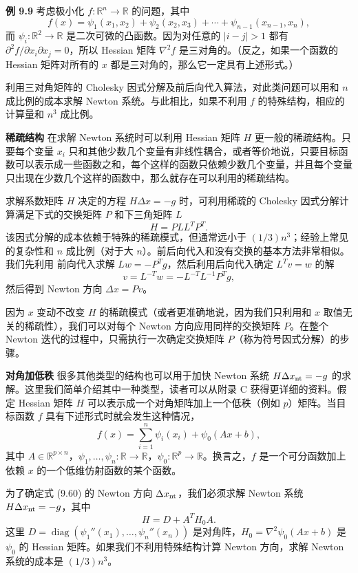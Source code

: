 \documentclass[UTF8,12pt,a4paper,fontset=fandol]{ctexart}
\begin{document}
\noindent\textbf{例 9.9}\quad
考虑极小化 $f:\mathbb{R}^n\to\mathbb{R}$ 的问题，其中
\[
f(x)=\psi_1(x_1,x_2)+\psi_2(x_2,x_3)+\cdots+\psi_{n-1}(x_{n-1},x_n),
\]
而 $\psi_i:\mathbb{R}^2\to\mathbb{R}$ 是二次可微的凸函数。因为对任意的 $|i-j|>1$ 都有 $\partial^2 f/\partial x_i\partial x_j=0$，所以 Hessian 矩阵 $\nabla^2 f$ 是三对角的。（反之，如果一个函数的 Hessian 矩阵对所有的 $x$ 都是三对角的，那么它一定具有上述形式。）

利用三对角矩阵的 Cholesky 因式分解及前后向代入算法，对此类问题可以用和 $n$ 成比例的成本求解 Newton 系统。与此相比，如果不利用 $f$ 的特殊结构，相应的计算量和 $n^3$ 成比例。

\noindent\textbf{稀疏结构}\quad
在求解 Newton 系统时可以利用 Hessian 矩阵 $H$ 更一般的稀疏结构。只要每个变量 $x_i$ 只和其他少数几个变量有非线性耦合，或者等价地说，只要目标函数可以表示成一些函数之和，每个这样的函数只依赖少数几个变量，并且每个变量只出现在少数几个这样的函数中，那么就存在可以利用的稀疏结构。

求解系数矩阵 $H$ 决定的方程 $H\Delta x=-g$ 时，可利用稀疏的 Cholesky 因式分解计算满足下式的交换矩阵 $P$ 和下三角矩阵 $L$
\[
H=PLL^TP^T.
\]
该因式分解的成本依赖于特殊的稀疏模式，但通常远小于 $(1/3)n^3$；经验上常见的复杂性和 $n$ 成比例（对于大 $n$）。前后向代入和没有交换的基本方法非常相似。我们先利用
前向代入求解 $Lw=-P^Tg$，然后利用后向代入确定 $L^Tv=w$ 的解
\[
v=L^{-T}w=-L^{-T}L^{-1}P^Tg,
\]
然后得到 Newton 方向 $\Delta x=Pv$。

因为 $x$ 变动不改变 $H$ 的稀疏模式（或者更准确地说，因为我们只利用和 $x$ 取值无关的稀疏性），我们可以对每个 Newton 方向应用同样的交换矩阵 $P$。在整个 Newton 迭代的过程中，只需执行一次确定交换矩阵 $P$（称为符号因式分解）的步骤。

\noindent\textbf{对角加低秩}\quad
很多其他类型的结构也可以用于加快 Newton 系统 $H\Delta x_{\rm nt}=-g$ 的求解。这里我们简单介绍其中一种类型，读者可以从附录 C 获得更详细的资料。假定 Hessian 矩阵 $H$ 可以表示成一个对角矩阵加上一个低秩（例如 $p$）矩阵。当目标函数 $f$ 具有下述形式时就会发生这种情况，
\begin{equation}
f(x)=\sum_{i=1}^n\psi_i(x_i)+\psi_0(Ax+b),
\tag{9.60}
\end{equation}
其中 $A\in\mathbb{R}^{p\times n}$，$\psi_1,\ldots,\psi_n:\mathbb{R}\to\mathbb{R}$，$\psi_0:\mathbb{R}^p\to\mathbb{R}$。换言之，$f$ 是一个可分函数加上依赖 $x$ 的一个低维仿射函数的某个函数。

为了确定式 (9.60) 的 Newton 方向 $\Delta x_{\rm nt}$，我们必须求解 Newton 系统 $H\Delta x_{\rm nt}=-g$，其中
\[
H=D+A^TH_0A.
\]
这里 $D=\operatorname{diag}(\psi_1''(x_1),\ldots,\psi_n''(x_n))$ 是对角阵，$H_0=\nabla^2\psi_0(Ax+b)$ 是 $\psi_0$ 的 Hessian 矩阵。如果我们不利用特殊结构计算 Newton 方向，求解 Newton 系统的成本是 $(1/3)n^3$。
\end{document}

